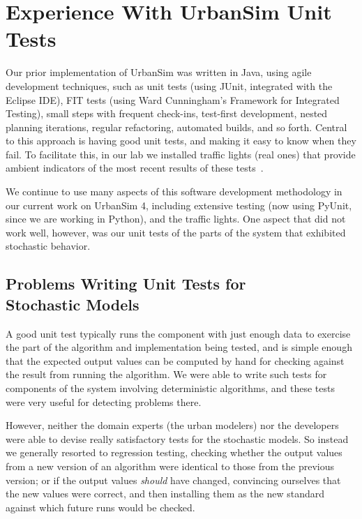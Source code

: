 \documentclass{sig-alternate}
\begin{document}
\newpage

\section{Experience With UrbanSim Unit Tests}
\label{prior-experience}

Our prior implementation of UrbanSim was written in Java, using agile
development techniques, such as unit tests (using JUnit, integrated with
the Eclipse IDE), FIT tests (using Ward Cunningham's Framework for
Integrated Testing), small steps with frequent check-ins, test-first
development, nested planning iterations, regular refactoring, automated
builds, and so forth.  Central to this approach is having good unit tests,
and making it easy to know when they fail.  To facilitate this, in our lab
we installed traffic lights (real ones) that provide ambient indicators of
the most recent results of these tests~\cite{freeman-benson-agile-2003}.

We continue to use many aspects of this software development methodology in
our current work on UrbanSim 4, including extensive testing (now using PyUnit,
since we are working in Python), and the traffic lights.  One aspect that did
not work well, however, was our unit tests of the parts of the system
that exhibited stochastic behavior.

\subsection{Problems Writing Unit Tests for \\ Stochastic Models}

A good
unit test typically runs the component with just enough data to exercise the
part of the algorithm and implementation being tested, and is simple enough
that the expected output values can be computed by hand for checking against
the result from running the algorithm.  We were able to write such tests for
components of the system involving deterministic algorithms, and these tests
were very useful for detecting problems there.

However, neither the domain experts (the urban modelers) nor the developers
were able to devise really satisfactory tests for the stochastic models.
So instead we generally resorted to regression testing, checking whether
the output values from a new version of an algorithm were identical to
those from the previous version; or if the output values \emph{should} have
changed, convincing ourselves that the new values were correct, and then
installing them as the new standard against which future runs would be
checked.
\end{document}
